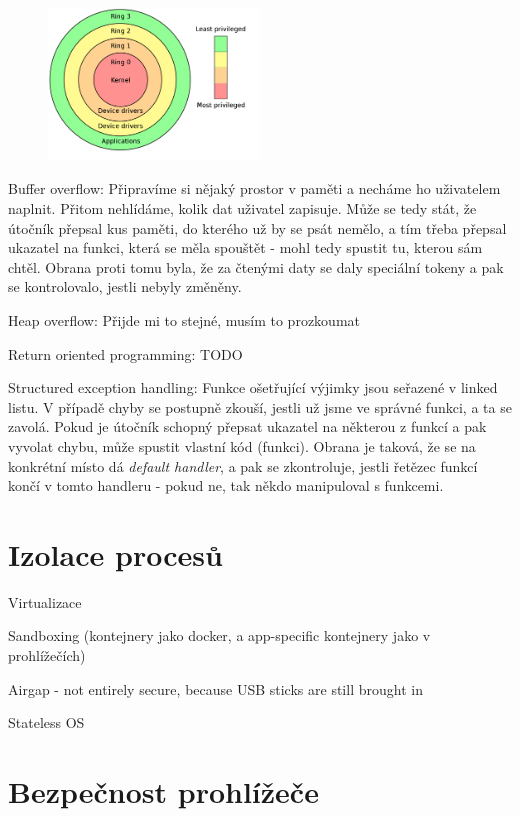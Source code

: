\begin{figure}[ht!]
\centering
\includegraphics[width=0.5\textwidth]{oborove/BSY/img/kernel-rings.png}
\end{figure}

Buffer overflow: Připravíme si nějaký prostor v paměti a necháme ho uživatelem naplnit. Přitom nehlídáme, kolik dat uživatel zapisuje. Může se tedy stát, že útočník přepsal kus paměti, do kterého už by se psát nemělo, a tím třeba přepsal ukazatel na funkci, která se měla spouštět - mohl tedy spustit tu, kterou sám chtěl. Obrana proti tomu byla, že za čtenými daty se daly speciální tokeny a pak se kontrolovalo, jestli nebyly změněny.

Heap overflow: Přijde mi to stejné, musím to prozkoumat

Return oriented programming: TODO

Structured exception handling: Funkce ošetřující výjimky jsou seřazené v linked listu. V případě chyby se postupně zkouší, jestli už jsme ve správné funkci, a ta se zavolá. Pokud je útočník schopný přepsat ukazatel na některou z funkcí a pak vyvolat chybu, může spustit vlastní kód (funkci). Obrana je taková, že se na konkrétní místo dá \textit{default handler}, a pak se zkontroluje, jestli řetězec funkcí končí v tomto handleru - pokud ne, tak někdo manipuloval s funkcemi.


\section{Izolace procesů}

Virtualizace

Sandboxing (kontejnery jako docker, a app-specific kontejnery jako v prohlížečích)

Airgap - not entirely secure, because USB sticks are still brought in

Stateless OS



\section{Bezpečnost prohlížeče}

